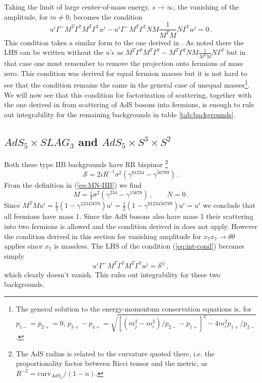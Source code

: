 \documentclass[a4paper,11pt]{article}
\begin{document}
Taking the limit of large center-of-mass energy, $s\rightarrow\infty$, the vanishing of the amplitude, for $m\neq0$, becomes the condition
\begin{equation}
u^i\Gamma^-M^T\Gamma^7M^T\Gamma^7u^j
-u^i\Gamma^-M^T\Gamma^7NM\frac{1}{M^TM}N\Gamma^7u^j
=0\,.
\label{eq:int-cond}
%
%
%
\end{equation}
This condition takes a similar form to the one derived in \cite{Wulff:2017lxh}. As noted there the LHS can be written without the $u$'s as $M^T\Gamma^7M^T\Gamma^7-M^T\Gamma^7NM\frac{1}{M^TM}N\Gamma^7$ but in that case one must remember to remove the projection onto fermions of mass zero. This condition was derived for equal fermion masses but it is not hard to see that the condition remains the same in the general case of unequal masses\footnote{The general solution to the energy-momentum conservation equations is, for $p_{1-}=p_{2+}=0$, $p_{3+}-p_{4+}=\sqrt{[(m_j^2-m_i^2)/p_{2-}-p_{1+}]^2-4m_i^2p_{1+}/p_{2-}}$.}. We will now see that this condition for factorization of scattering, together with the one derived in \cite{Wulff:2017lxh} from scattering of AdS bosons into fermions, is enough to rule out integrability for the remaining backgrounds in table \ref{tab:backgrounds}.


\subsection{$AdS_5\times SLAG_3$ and $AdS_5\times S^3\times S^2$}
Both these type IIB backgrounds have RR bispinor \cite{Wulff:2017zbl}\footnote{The AdS radius is related to the curvature quoted there, i.e. the proportionality factor between Ricci tensor and the metric, as $R^{-2}=\mathrm{curv}_{AdS_n}/(1-n)$.}
\begin{equation}
\mathcal S=2iR^{-1}\sigma^2(\gamma^{01234}-\gamma^{56789})\,.
\end{equation}
From the definition in (\ref{eq:MN-IIB}) we find
\begin{equation}
M=\tfrac{i}{2}\sigma^2(\gamma^{234}-\gamma^{15678})\,,\qquad N=0\,.
\end{equation}
Since $M^TMu^i=\frac12(1-\gamma^{12345678})u^i=\frac12(1-\gamma^{0123456789})u^i=u^i$ we conclude that all fermions have mass 1. Since the AdS bosons also have mass 1 their scattering into two fermions is allowed and the condition derived in \cite{Wulff:2017lxh} does not apply. However the condition derived in this section for vanishing amplitude for $x_7x_7\rightarrow\theta\theta$ applies since $x_7$ is massless. The LHS of the condition (\ref{eq:int-cond}) becomes simply
\begin{equation}
u^i\Gamma^-M^T\Gamma^7M^T\Gamma^7u^j=\delta^{ij}\,,
\end{equation}
which clearly doesn't vanish. This rules out integrability for these two backgrounds.
\end{document}
